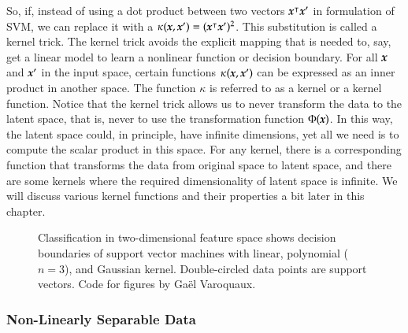 \begin{refsection}
So, if, instead of using a dot product between two vectors $\boldsymbol{x}^\intercal\boldsymbol{x}'$ in formulation of SVM, we can replace it with a $\kappa(\boldsymbol{x},\boldsymbol{x}')=(\boldsymbol{x}^\intercal \boldsymbol{x}')^2$. This substitution is called a kernel trick. The kernel trick avoids the explicit mapping that is needed to, say, get a linear model to learn a nonlinear function or decision boundary. For all $\boldsymbol{x}$ and $\boldsymbol{x}'$ in the input space, certain functions $\kappa(\boldsymbol{x}, \boldsymbol{x}')$ can be expressed as an inner product in another space. The function $\kappa$ is referred to as a kernel or a kernel function. Notice that the kernel trick allows us to never transform the data to the latent space, that is, never to use the transformation function $\Phi(\boldsymbol{x})$. In this way, the latent space could, in principle, have infinite dimensions, yet all we need is to compute the scalar product in this space. For any kernel, there is a corresponding function that transforms the data from original space to latent space, and there are some kernels where the required dimensionality of latent space is infinite. We will discuss various kernel functions and their properties a bit later in this chapter.

\begin{figure}
\caption{Classification in two-dimensional feature space shows decision boundaries of support vector machines with linear, polynomial ($n=3$), and Gaussian kernel. Double-circled data points are support vectors. Code for figures by Gaël Varoquaux.}
\label{fig:kernels-poly}
\end{figure}

\subsubsection*{Non-Linearly Separable Data}


\end{refsection}
